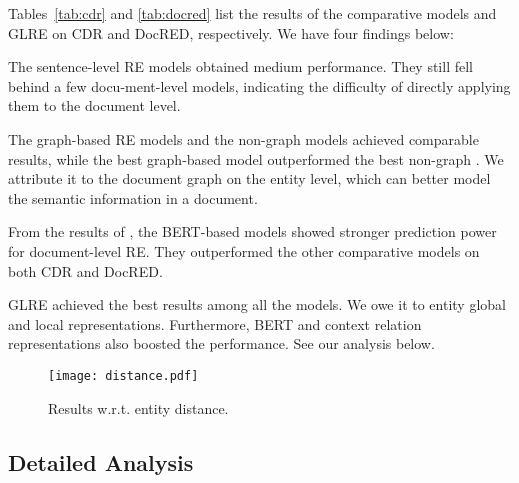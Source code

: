 \documentclass[11pt,a4paper]{article}
\begin{document}
Tables~\ref{tab:cdr} and \ref{tab:docred} list the results of the comparative models and GLRE on CDR and DocRED, respectively. We have four findings below:
\begin{compactenum}[(1)]
\item The sentence-level RE models \cite{zhang2018graph,yao2019docred} obtained medium performance. They still fell behind a few docu-ment-level models, indicating the difficulty of directly applying them to the document level.

\item The graph-based RE models \cite{panyam2018exploiting,verga2018simultaneously,christopoulou2019connecting} and the non-graph models \cite{zhou2016exploiting,gu2017chemical,nguyen2018convolutional,zheng2018effective} achieved comparable results, while the best graph-based model \cite{christopoulou2019connecting} outperformed the best non-graph \cite{nguyen2018convolutional}. We attribute it to the document graph on the entity level, which can better model the semantic information in a document.

\item From the results of \citet{wang2019fine,tang2020hin}, the BERT-based models showed stronger prediction power for document-level RE. They outperformed the other comparative models on both CDR and DocRED.

\item GLRE achieved the best results among all the models. We owe it to entity global and local representations. Furthermore, BERT and context relation representations also boosted the performance. See our analysis below.
\end{compactenum}

\begin{figure}
	\centering
	\texttt{[image: distance.pdf]}
	\caption{Results w.r.t. entity distance.}
	\label{fig:dist}
\end{figure}

\subsection{Detailed Analysis}
\end{document}
